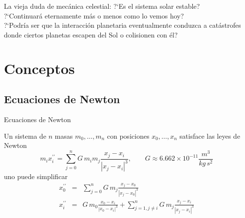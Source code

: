 \documentclass[8pt]{beamer}
\renewcommand{\>}{\rangle}
\newcommand{\<}{\langle}
\newcommand{\be}{\begin{equation}}
\newcommand{\ee}{\end{equation}}
\newcommand{\bea}{\begin{eqnarray}}
\newcommand{\eea}{\end{eqnarray}}
\begin{document}
\begin{frame}
{}
\vspace{-0.5cm}

\begin{mybox}{La vieja duda de mecánica celestial:}
?`Es el sistema solar estable?\\
?`Continuará eternamente más o menos como lo vemos hoy?\\
?`Podría ser que la interacción planetaria eventualmente conduzca a catástrofes donde 
ciertos planetas escapen del Sol o colisionen con él?
\end{mybox}
\pause

\begin{figure}[b]
\end{figure}

\end{frame}

\section[Conceptos]{Conceptos}

\subsection[Ecuaciones de Newton]{Ecuaciones de Newton}

\begin{frame}{Ecuaciones de Newton}

Un sistema de $n$ masas $m_{0}, \ldots , m_{n}$ con posiciones $x_{0}, \ldots , x_{n}$ 
satisface las leyes de Newton
\be
	m_{i} x_{i}^{\prime \prime} = \sum_{j=0}^{n}  G\, m_{i}m_{j} \frac{x_{j}-x_{i}}{|x_{j}-x_{i}|^{3}},
	\qquad G \approx 6.662 \times 10^{-11} \frac{m^{3}}{kg\, s^{2}} \nonumber
\ee
uno puede simplificar
\bea 
	x_{0}^{\prime \prime} &=& \sum_{j=0}^{n}  G\, m_{j} \frac{x_{j}-x_{0}}{|x_{j}-x_{0}|^{3}} \nonumber \\
	x_{i}^{\prime \prime} &=&  G\, m_{0} \frac{x_{0}-x_{i}}{|x_{0}-x_{i}|^{3}} + \sum_{j=1,j\neq i}^{n}  G\, m_{j} \frac{x_{j}-x_{i}}{|x_{j}-x_{i}|^{3}} \nonumber
\eea

\end{frame}
\end{document}
